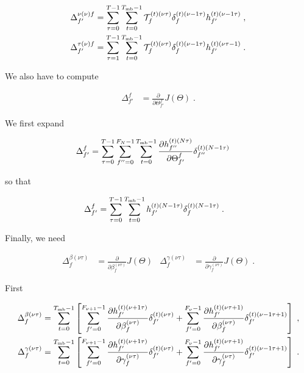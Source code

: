\begin{subappendices}
\begin{align}
\Delta^{\nu(\nu)f}_{f'}&=\sum_{\tau=0}^{T-1}\sum_{t=0}^{T_{{\rm mb}}-1}
%
\mathcal{T}^{(t)(\nu\tau)}_{f}\delta^{(t)(\nu-1\tau)}_{f}h^{(t)(\nu-1\tau)}_{f'}\;,\\
%
\Delta^{\tau(\nu)f}_{f'}&=\sum_{\tau=1}^{T-1}\sum_{t=0}^{T_{{\rm mb}}-1}
%
\mathcal{T}^{(t)(\nu\tau)}_{f}\delta^{(t)(\nu-1\tau)}_{f}h^{(t)(\nu\tau-1)}_{f'}\;.
\end{align}

We also have to compute

\begin{align}
\Delta^{f}_{f'}&=\frac{\partial}{\partial \Theta^{f}_{f'}} J(\Theta)\;.
\end{align}

We first expand

\begin{align}
\Delta^{f}_{f'}&=\sum_{\tau=0}^{T-1}\sum_{f''=0}^{F_N-1}\sum_{t=0}^{T_{{\rm mb}}-1}
%
\frac{\partial h^{(t)(N\tau)}_{f''}}{\partial \Theta^{f}_{f'}}
%
\delta^{(t)(N-1\tau)}_{f''}\;
\end{align}

so that

\begin{align}
\Delta^{f}_{f'}&=\sum_{\tau=0}^{T-1}\sum_{t=0}^{T_{{\rm mb}}-1} h^{(t)(N-1\tau)}_{f'}\delta^{(t)(N-1\tau)}_{f}\;.
\end{align}

Finally, we need

\begin{align}
\Delta^{\beta(\nu \tau)}_{f}&=\frac{\partial}{\partial\beta^{(\nu \tau)}_{f}} J(\Theta)&
%
\Delta^{\gamma(\nu \tau)}_{f}&=\frac{\partial}{\partial \gamma^{(\nu \tau)}_{f}} J(\Theta)\;.
\end{align}

First

\begin{align}
\Delta^{\beta(\nu \tau)}_{f}&=\sum_{t=0}^{T_{{\rm mb}}-1}\left[\sum_{f'=0}^{F_{\nu+1}-1}
%
\frac{\partial h^{(t)(\nu+1\tau)}_{f'}}{\partial \beta^{(\nu \tau)}_{f}}\delta^{(t)(\nu\tau)}_{f'}+
%
\sum_{f'=0}^{F_{\nu}-1}
%
\frac{\partial h^{(t)(\nu\tau+1)}_{f'}}{\partial \beta^{(\nu \tau)}_{f}}\delta^{(t)(\nu-1\tau+1)}_{f'}\right]\;,\notag\\
%
\Delta^{\gamma(\nu \tau)}_{f}&=\sum_{t=0}^{T_{{\rm mb}}-1}\left[\sum_{f'=0}^{F_{\nu+1}-1}
%
\frac{\partial h^{(t)(\nu+1\tau)}_{f'}}{\partial \gamma^{(\nu \tau)}_{f}}\delta^{(t)(\nu\tau)}_{f'}+
%
\sum_{f'=0}^{F_{\nu}-1}
%
\frac{\partial h^{(t)(\nu\tau+1)}_{f'}}{\partial \gamma^{(\nu \tau)}_{f}}\delta^{(t)(\nu-1\tau+1)}_{f'}\right]\;.
\end{align}


\end{subappendices}
